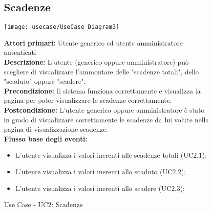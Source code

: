 \begin{figure}[h!]
\subsection{Scadenze}
   \begin{center}
    \texttt{[image: usecase/UseCase\_Diagram3]} 
    \caption{Use Case - UC2: Scadenze}
    \end{center}

\textbf{Attori primari:} Utente generico ed utente amministratore autenticati
\\
\textbf{Descrizione:}  L'utente (generico oppure amministratore) può scegliere di visualizzare l'ammontare delle "scadenze totali", dello "scaduto" oppure "scadere".  \\

\textbf{Precondizione:} Il sistema funziona correttamente e visualizza la pagina per poter visualizzare le scadenze correttamente. \\

\textbf{Postcondizione:} L'utente generico oppure amministratore è stato in grado di visualizzare correttamente le scadenze da lui volute nella pagina di visualizzazione scadenze. \\


\textbf{Flusso base degli eventi:} 

\begin{itemize}
\item L'utente visualizza i valori inerenti alle scadenze totali (UC2.1);
\item L'utente visualizza i valori inerenti allo scaduto (UC2.2);
\item L'utente visualizza i valori inerenti allo scadere (UC2.3);
\end{itemize}
\end{figure}


